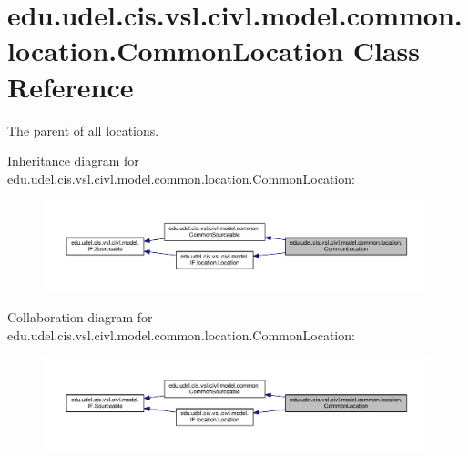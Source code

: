 \hypertarget{classedu_1_1udel_1_1cis_1_1vsl_1_1civl_1_1model_1_1common_1_1location_1_1CommonLocation}{}\section{edu.\+udel.\+cis.\+vsl.\+civl.\+model.\+common.\+location.\+Common\+Location Class Reference}
\label{classedu_1_1udel_1_1cis_1_1vsl_1_1civl_1_1model_1_1common_1_1location_1_1CommonLocation}


The parent of all locations.  




Inheritance diagram for edu.\+udel.\+cis.\+vsl.\+civl.\+model.\+common.\+location.\+Common\+Location\+:
\nopagebreak
\begin{figure}[H]
\begin{center}
\leavevmode
\includegraphics[width=350pt]{classedu_1_1udel_1_1cis_1_1vsl_1_1civl_1_1model_1_1common_1_1location_1_1CommonLocation__inherit__graph}
\end{center}
\end{figure}


Collaboration diagram for edu.\+udel.\+cis.\+vsl.\+civl.\+model.\+common.\+location.\+Common\+Location\+:
\nopagebreak
\begin{figure}[H]
\begin{center}
\leavevmode
\includegraphics[width=350pt]{classedu_1_1udel_1_1cis_1_1vsl_1_1civl_1_1model_1_1common_1_1location_1_1CommonLocation__coll__graph}
\end{center}
\end{figure}
